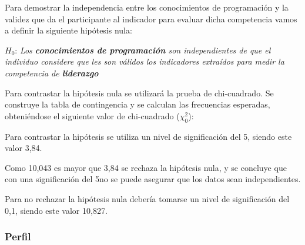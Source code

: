 Para demostrar la independencia entre los conocimientos de programación y la validez que da el participante al indicador para evaluar dicha competencia vamos a definir la siguiente hipótesis nula:

\begin{mdframed}[style=hipotesis0]
$H_0$: \emph{Los \textbf{conocimientos de programación} son independientes de que el individuo considere que les son válidos los indicadores extraídos para medir la competencia de \textbf{liderazgo}}
\end{mdframed}

Para contrastar la hipótesis nula se utilizará la prueba de chi-cuadrado. Se construye la tabla de contingencia y se calculan las frecuencias esperadas, obteniéndose el siguiente valor de chi-cuadrado ($\chi^2_0$): 

\begin{center}
\end{center}

Para contrastar la hipótesis se utiliza un nivel de significación del 5\percentage, siendo este valor 3,84. 

\begin{center}
\end{center}

Como 10,043 es mayor que 3,84 se rechaza la hipótesis nula, y se concluye que con una significación del 5\percentage no se puede asegurar que los datos sean independientes.

\begin{center}
\end{center}

Para no rechazar la hipótesis nula debería tomarse un nivel de significación del 0,1\percentage, siendo este valor 10,827.

\begin{center}
\end{center}


\subsubsection{Perfil}

